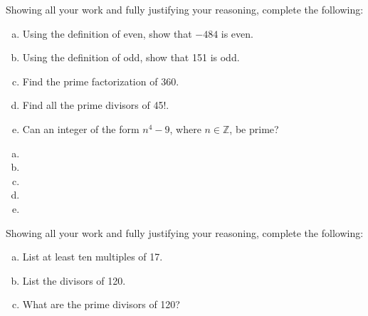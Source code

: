\documentclass[11pt,letterpaper]{article}
\begin{document}

 Showing all your work and fully justifying your reasoning, complete the following:
	\begin{enumerate}[(a)]
	\item Using the definition of even, show that $-484$ is even.
	\item Using the definition of odd, show that 151 is odd.
	\item Find the prime factorization of 360. 
	\item Find all the prime divisors of 45!. 
	\item Can an integer of the form $n^4 - 9$, where $n \in \mathbb{Z}$, be prime?
	\end{enumerate} \pspace

\sol 
\begin{enumerate}[(a)]
\item 
\item 
\item 
\item 
\item 
\end{enumerate}



\newpage



 Showing all your work and fully justifying your reasoning, complete the following:
	\begin{enumerate}[(a)]
	\item List at least ten multiples of 17.
	\item List the divisors of 120.
	\item What are the prime divisors of 120?
	\end{enumerate} \pspace
\end{document}
